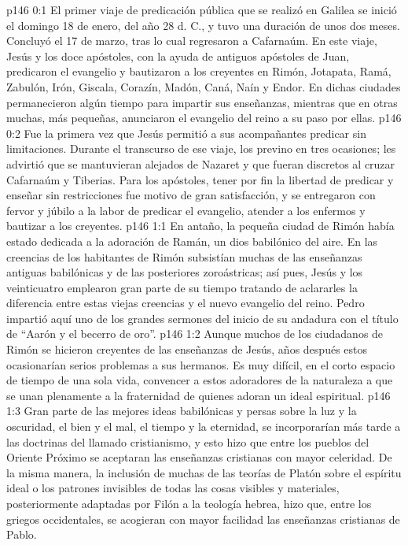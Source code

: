 \author{Comisión de seres intermedios}
\vs p146 0:1 El primer viaje de predicación pública que se realizó en Galilea se inició el domingo 18 de enero, del año 28 d. C., y tuvo una duración de unos dos meses. Concluyó el 17 de marzo, tras lo cual regresaron a Cafarnaúm. En este viaje, Jesús y los doce apóstoles, con la ayuda de antiguos apóstoles de Juan, predicaron el evangelio y bautizaron a los creyentes en Rimón, Jotapata, Ramá, Zabulón, Irón, Giscala, Corazín, Madón, Caná, Naín y Endor. En dichas ciudades permanecieron algún tiempo para impartir sus enseñanzas, mientras que en otras muchas, más pequeñas, anunciaron el evangelio del reino a su paso por ellas.
\vs p146 0:2 Fue la primera vez que Jesús permitió a sus acompañantes predicar sin limitaciones. Durante el transcurso de ese viaje, los previno en tres ocasiones; les advirtió que se mantuvieran alejados de Nazaret y que fueran discretos al cruzar Cafarnaúm y Tiberias. Para los apóstoles, tener por fin la libertad de predicar y enseñar sin restricciones fue motivo de gran satisfacción, y se entregaron con fervor y júbilo a la labor de predicar el evangelio, atender a los enfermos y bautizar a los creyentes.
\vs p146 1:1 En antaño, la pequeña ciudad de Rimón había estado dedicada a la adoración de Ramán, un dios babilónico del aire. En las creencias de los habitantes de Rimón subsistían muchas de las enseñanzas antiguas babilónicas y de las posteriores zoroástricas; así pues, Jesús y los veinticuatro emplearon gran parte de su tiempo tratando de aclararles la diferencia entre estas viejas creencias y el nuevo evangelio del reino. Pedro impartió aquí uno de los grandes sermones del inicio de su andadura con el título de “Aarón y el becerro de oro”.
\vs p146 1:2 Aunque muchos de los ciudadanos de Rimón se hicieron creyentes de las enseñanzas de Jesús, años después estos ocasionarían serios problemas a sus hermanos. Es muy difícil, en el corto espacio de tiempo de una sola vida, convencer a estos adoradores de la naturaleza a que se unan plenamente a la fraternidad de quienes adoran un ideal espiritual.
\vs p146 1:3 \pc Gran parte de las mejores ideas babilónicas y persas sobre la luz y la oscuridad, el bien y el mal, el tiempo y la eternidad, se incorporarían más tarde a las doctrinas del llamado cristianismo, y esto hizo que entre los pueblos del Oriente Próximo se aceptaran las enseñanzas cristianas con mayor celeridad. De la misma manera, la inclusión de muchas de las teorías de Platón sobre el espíritu ideal o los patrones invisibles de todas las cosas visibles y materiales, posteriormente adaptadas por Filón a la teología hebrea, hizo que, entre los griegos occidentales, se acogieran con mayor facilidad las enseñanzas cristianas de Pablo.
